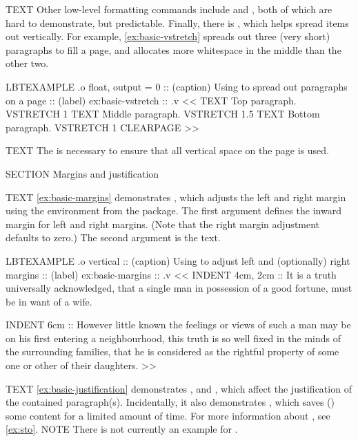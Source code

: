 \begin{lbt}
    TEXT Other low-level formatting commands include  and , both of which are hard to demonstrate, but predictable. Finally, there is , which helps spread items out vertically. For example, \vref{ex:basic-vstretch} spreads out three (very short) paragraphs to fill a page, and allocates more whitespace in the middle than the other two.

    LBTEXAMPLE .o float, output = 0
    :: (caption) Using  to spread out paragraphs on a page
    :: (label) ex:basic-vstretch
    :: .v <<
      TEXT Top paragraph.
      VSTRETCH 1
      TEXT Middle paragraph.
      VSTRETCH 1.5
      TEXT Bottom paragraph.
      VSTRETCH 1
      CLEARPAGE
    >>

    TEXT The  is necessary to ensure that all vertical space on the page is used.





    SECTION Margins and justification

    TEXT \vref{ex:basic-margins} demonstrates , which adjusts the left and right margin using the  environment from the  package. The first argument defines the inward margin for left and right margins. (Note that the right margin adjustment defaults to zero.) The second argument is the text.

    LBTEXAMPLE .o vertical
    :: (caption) Using  to adjust left and (optionally) right margins
    :: (label) ex:basic-margins
    :: .v <<
      INDENT 4cm, 2cm :: It is a truth universally acknowledged, that a single man in possession of a good fortune, must be in want of a wife.

      INDENT 6cm :: However little known the feelings or views of such a man may be on his first entering a neighbourhood, this truth is so well fixed in the minds of the surrounding families, that he is considered as the rightful property of some one or other of their daughters.
    >>

    TEXT \vref{ex:basic-justification} demonstrates ,  and , which affect the justification of the contained paragraph(s). Incidentally, it also demonstrates , which saves () some content for a limited amount of time. For more information about , see \vref{ex:sto}.
    NOTE There is not currently an example for .


\end{lbt}
